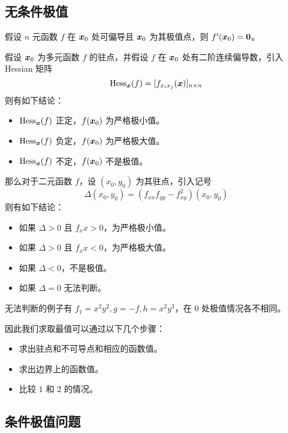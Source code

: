 \subsection{无条件极值}

\begin{theorem}
	假设 $n$ 元函数 $f$ 在 $\boldsymbol{x}_0$ 处可偏导且 $\boldsymbol{x}_0$ 为其极值点，则 $f'(\boldsymbol{x}_0) = \boldsymbol{0}$。
\end{theorem}

\begin{theorem}
	假设 $\boldsymbol{x}_0$ 为多元函数 $f$ 的驻点，并假设 $f$ 在 $\boldsymbol{x}_0$ 处有二阶连续偏导数，引入 Hessian 矩阵
	\[ \operatorname{Hess}_{\boldsymbol{x}}(f) = [f_{x_i x_j}(\boldsymbol{x})]_{n \times n} \]
	则有如下结论：
	\begin{itemize}
		\item $\operatorname{Hess}_{\boldsymbol{x}}(f)$ 正定，$f(\boldsymbol{x}_0)$ 为严格极小值。
		\item $\operatorname{Hess}_{\boldsymbol{x}}(f)$ 负定，$f(\boldsymbol{x}_0)$ 为严格极大值。
		\item $\operatorname{Hess}_{\boldsymbol{x}}(f)$ 不定，$f(\boldsymbol{x}_0)$ 不是极值。
	\end{itemize}
\end{theorem}

那么对于二元函数 $f$，设 $(x_0, y_0)$ 为其驻点，引入记号
\[ \Delta(x_0, y_0) = (f_{xx} f_{yy} - f_{xy}^2)(x_0, y_0) \]
则有如下结论：
\begin{itemize}
	\item 如果 $\Delta > 0$ 且 $f_xx > 0$，为严格极小值。
	\item 如果 $\Delta > 0$ 且 $f_xx < 0$，为严格极大值。
	\item 如果 $\Delta < 0$，不是极值。
	\item 如果 $\Delta = 0$ 无法判断。
\end{itemize}

无法判断的例子有 $f_1 = x^2y^2, g = -f, h = x^2 y^3$，在 $0$ 处极值情况各不相同。

因此我们求取最值可以通过以下几个步骤：

\begin{itemize}
	\item 求出驻点和不可导点和相应的函数值。
	\item 求出边界上的函数值。
	\item 比较 $1$ 和 $2$ 的情况。
\end{itemize}

\subsection{条件极值问题}

